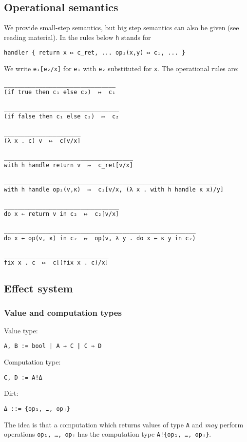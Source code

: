 \documentclass{article}
\begin{document}
\subsection{Operational semantics}

We provide small-step semantics, but big step semantics can also be given (see
reading material). In the rules below \lstinline{h} stands for
%
\begin{lstlisting}
handler { return x ↦ c_ret, ... opᵢ(x,y) ↦ cᵢ, ... }
\end{lstlisting}
%
We write \lstinline{e₁[e₂/x]} for \lstinline{e₁} with \lstinline{e₂} substituted
for \lstinline{x}. The operational rules are:
%
\begin{lstlisting}
________________________________
(if true then c₁ else c₂)  ↦  c₁

_________________________________
(if false then c₁ else c₂)  ↦  c₂

______________________
(λ x . c) v  ↦  c[v/x]

_____________________________________
with h handle return v  ↦  c_ret[v/x]

_____________________________________________________________
with h handle opᵢ(v,κ)  ↦  cᵢ[v/x, (λ x . with h handle κ x)/y]

_________________________________
do x ← return v in c₂  ↦  c₂[v/x]

_______________________________________________________
do x ← op(v, κ) in c₂  ↦  op(v, λ y . do x ← κ y in c₂)

______________________________
fix x . c  ↦  c[(fix x . c)/x]
\end{lstlisting}

\subsection{Effect system}

\subsubsection{Value and computation types}

Value type:
%
\begin{lstlisting}
A, B := bool | A → C | C ⇒ D
\end{lstlisting}
%
Computation type:
%
\begin{lstlisting}
C, D := A!Δ
\end{lstlisting}
%
Dirt:
%
\begin{lstlisting}
Δ ::= {op₁, …, opⱼ}
\end{lstlisting}
%
The idea is that a computation which returns values of type \lstinline{A} and
\emph{may} perform operations \lstinline{op₁, …, opⱼ} has the computation type
\lstinline|A!{op₁, …, opⱼ}|.
\end{document}
